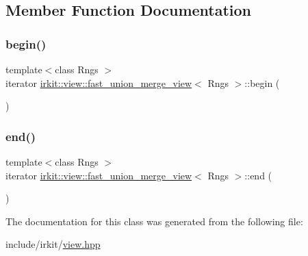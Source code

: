 \subsection{Member Function Documentation}
\mbox{\label{classirkit_1_1view_1_1fast__union__merge__view_ae204e072ecbd702c09c7813e05828138}} 
\subsubsection{\texorpdfstring{begin()}{begin()}}
{\footnotesize\ttfamily template$<$class Rngs $>$ \\
iterator \mbox{\hyperlink{classirkit_1_1view_1_1fast__union__merge__view}{irkit\+::view\+::fast\+\_\+union\+\_\+merge\+\_\+view}}$<$ Rngs $>$\+::begin (\begin{DoxyParamCaption}{ }\end{DoxyParamCaption})\hspace{0.3cm}{\ttfamily [inline]}}

\mbox{\label{classirkit_1_1view_1_1fast__union__merge__view_aeabbfef53da70d55173f57ca04dd1070}} 
\subsubsection{\texorpdfstring{end()}{end()}}
{\footnotesize\ttfamily template$<$class Rngs $>$ \\
iterator \mbox{\hyperlink{classirkit_1_1view_1_1fast__union__merge__view}{irkit\+::view\+::fast\+\_\+union\+\_\+merge\+\_\+view}}$<$ Rngs $>$\+::end (\begin{DoxyParamCaption}{ }\end{DoxyParamCaption})\hspace{0.3cm}{\ttfamily [inline]}}



The documentation for this class was generated from the following file\+:\begin{DoxyCompactItemize}
\item 
include/irkit/\mbox{\hyperlink{view_8hpp}{view.\+hpp}}\end{DoxyCompactItemize}

